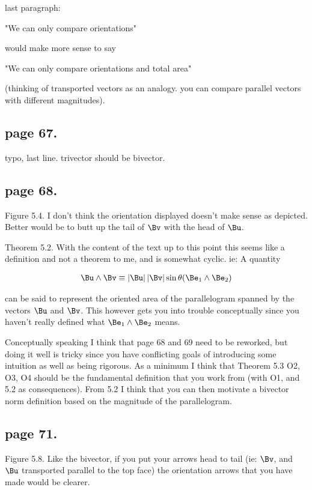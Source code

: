 last paragraph:

  "We can only compare orientations"

would make more sense to say

  "We can only compare orientations and total area"

(thinking of transported vectors as an analogy.  you can compare parallel vectors with different magnitudes).

\subsection{page 67. }

typo, last line.  trivector should be bivector.

\subsection{page 68. }

Figure 5.4.  I don't think the orientation displayed doesn't make sense as depicted.  Better would be to butt up the tail of $\Bv$ with the head of $\Bu$.

Theorem 5.2.  With the content of the text up to this point this seems like a
definition and not a theorem to me, and is somewhat cyclic.  ie: A quantity

\begin{align*}
\Bu \wedge \Bv \equiv \Abs{\Bu} \Abs{\Bv} \sin \theta (\Be_1 \wedge \Be_2)
\end{align*}

can be said to represent the oriented area of the parallelogram spanned by the
vectors $\Bu$ and $\Bv$.  This however gets you into trouble conceptually
since you haven't really defined what $\Be_1 \wedge \Be_2$ means.

Conceptually speaking I think that page 68 and 69 need to be reworked, but
doing it well is tricky since you have conflicting goals of introducing some
intuition as well as being rigorous.  As a minimum I think that Theorem 5.3
O2, O3, O4 should be the fundamental definition that you work from (with O1,
and 5.2 as consequences).  From 5.2 I think that you can then motivate a
bivector norm definition based on the magnitude of the parallelogram.

\subsection{page 71. }

Figure 5.8.  Like the bivector, if you put your arrows head to tail (ie: $\Bv$, and $\Bu$ transported parallel to the top face) the orientation arrows that
you have made would be clearer.

